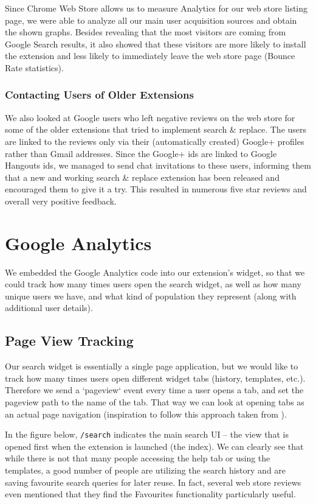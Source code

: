 \documentclass[bsc,frontabs,twoside,singlespacing,parskip,deptreport]{infthesis}
\begin{document}
Since Chrome Web Store allows us to measure Analytics for our web store listing page, we were able to analyze all our main user acquisition sources and obtain the shown graphs. Besides revealing that the most visitors are coming from Google Search results, it also showed that these visitors are more likely to install the extension and less likely to immediately leave the web store page (Bounce Rate statistics).

\subsubsection*{Contacting Users of Older Extensions}
We also looked at Google users who left negative reviews on the web store for some of the older extensions that tried to implement search \& replace. The users are linked to the reviews only via their (automatically created) Google+ profiles rather than Gmail addresses. Since the Google+ ids are linked to Google Hangouts ids, we managed to send chat invitations to these users, informing them that a new and working search \& replace extension has been released and encouraged them to give it a try. This resulted in numerous five star reviews and overall very positive feedback.

\section{Google Analytics}
We embedded the Google Analytics code into our extension's widget, so that we could track how many times users open the search widget, as well as how many unique users we have, and what kind of population they represent (along with additional user details).

\subsection{Page View Tracking}
Our search widget is essentially a single page application, but we would like to track how many times users open different widget tabs (history, templates, etc.). Therefore we send a `pageview` event every time a user opens a tab, and set the pageview path to the name of the tab. That way we can look at opening tabs as an actual page navigation (inspiration to follow this approach taken from \cite{A22}).

In the figure below, \texttt{/search} indicates the main search UI -- the view that is opened first when the extension is launched (the index). We can clearly see that while there is not that many people accessing the help tab or using the templates, a good number of people are utilizing the search history and are saving favourite search queries for later reuse. In fact, several web store reviews even mentioned that they find the Favourites functionality particularly useful.
\end{document}
